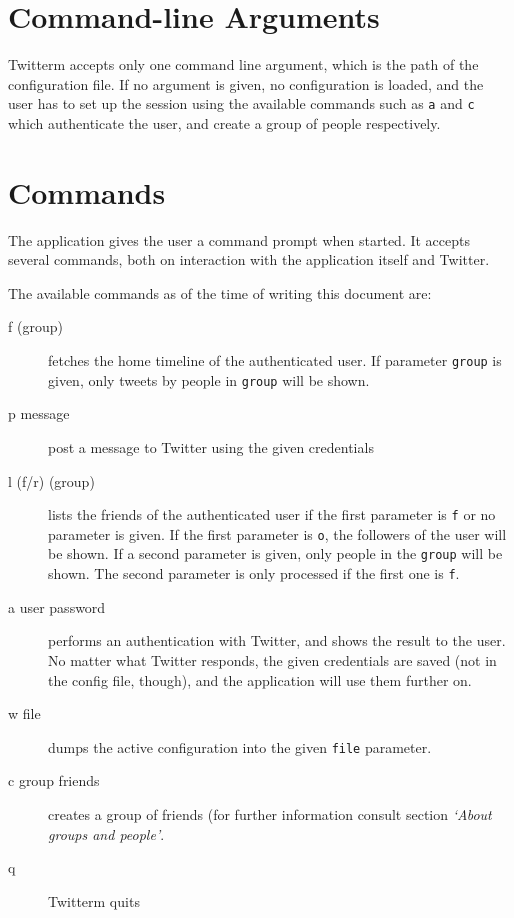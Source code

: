 \documentclass[10pt]{article}
\begin{document}


\section{Command-line Arguments}
Twitterm accepts only one command line argument, which is the path of the configuration file. If no argument is given, no configuration is loaded, and the user has to set up the session using the available commands such as \verb!a! and \verb!c! which authenticate the user, and create a group of people respectively.

\section{Commands}
The application gives the user a command prompt when started. It accepts several commands, both on interaction with the application itself and Twitter.

The available commands as of the time of writing this document are:

\begin{description}
	\item [f (group)] fetches the home timeline of the authenticated user. If parameter \verb!group! is given, only tweets by people in \verb!group! will be shown.
	\item [p message] post a message to Twitter using the given credentials
	\item [l (f/r) (group)] lists the friends of the authenticated user if the first parameter is \verb!f! or no parameter is given. If the first parameter is \verb!o!, the followers of the user will be shown. If a second parameter is given, only people in the \verb!group! will be shown. The second parameter is only processed if the first one is \verb!f!.
	\item [a user password] performs an authentication with Twitter, and shows the result to the user. No matter what Twitter responds, the given credentials are saved (not in the config file, though), and the application will use them further on.
	\item [w file] dumps the active configuration into the given \verb!file! parameter.
	\item [c group friends] creates a group of friends (for further information consult section \textit{`About groups and people'}.
	\item [q] Twitterm quits
\end{description}
\end{document}
